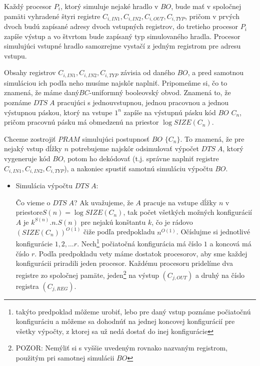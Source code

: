 \begin{dokaz}
Každý procesor $P_i$, ktorý simuluje nejaké hradlo v $BO$, bude
mať v spoločnej pamäti vyhradené štyri registre $C_{i,IN1},
C_{i,IN2}, C_{i,OUT} ,C_{i,TYP}$, pričom v prvých dvoch budú
zapísané adresy dvoch vstupných registrov, do tretieho procesor
$P_i$ zapíše výstup a vo štvrtom bude zapísaný typ simulovaného
hradla. Procesor simulujúci vstupné hradlo samozrejme vystačí z
jedným registrom pre adresu vstupu.

Obsahy registrov $C_{i,IN1}, C_{i,IN2}, C_{i,TYP}$ závisia od
daného $BO$, a pred samotnou simuláciou ich podľa neho musíme
najskôr naplniť. Pripomeňme si, čo to znamená, že máme
daný\linebreak $BC$-uniformný booleovský obvod. Znamená to, že
poznáme $DTS\; A$ pracujúci s jednou\linebreak vstupnou, jednou
pracovnou a jednou výstupnou páskou, ktorý na vstupe $1^n$ zapíše
na výstupnú pásku kód $BO$ $C_n$, pričom pracovnú pásku má
obmedzenú na priestor $\log SIZE(C_n)$.

Chceme zostrojiť $PRAM$ simulujúci postupnosť $BO$ $\{ C_n\}$. To
znamená, že pre nejaký vstup dĺžky $n$ potrebujeme najskôr
odsimulovať výpočet $DTS\; A$, ktorý vygeneruje kód $BO$, potom ho
dekódovať (t.j. správne naplniť registre $C_{i,IN1}, C_{i,IN2},
C_{i,TYP}$), a nakoniec spustiť samotnú simuláciu výpočtu $BO$.

\pagebreak

\begin{itemize}
  \item Simulácia výpočtu $DTS\; A$:

  Čo vieme o $DTS\; A$? Ak uvažujeme, že $A$ pracuje na vstupe
  dĺžky $n$ v priestore\linebreak $S(n)=\log SIZE(C_n)$, tak počet všetkých
  možných konfigurácií $A$ je $k^{S(n)}.n.S(n)$ pre nejakú
  konštantu $k$, čo je rádovo $(SIZE(C_n))^{O(1)}$ čiže podľa
  predpokladu $n^{O(1)}$. Očíslujme si jednotlivé konfigurácie
  $1,2,\dots r$. Nech\footnote{takýto predpoklad môžeme urobiť,
  lebo pre daný vstup poznáme počiatočnú konfiguráciu a môžeme sa
  dohodnúť na jednej koncovej konfigurácií pre všetky výpočty, z
  ktorej sa už nedá dostať do inej konfigurácie} počiatočná
  konfigurácia má číslo $1$ a koncová má číslo $r$. Podľa
  predpokladu vety máme dostatok procesorov, aby sme každej
  konfigurácii priradili jeden procesor. Každému procesoru
  pridelíme dva registre zo spoločnej pamäte, jeden\footnote{POZOR:
  Nemýliť si s vyššie uvedeným rovnako nazvaným registrom,
  použitým pri samotnej simulácii $BO$} na výstup $(C_{j,OUT})$
  a druhý na číslo registra $(C_{j,REG})$.


\end{itemize}
\end{dokaz}
